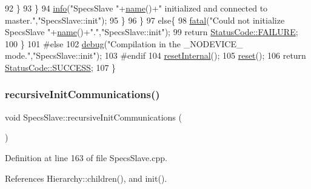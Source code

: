 \begin{DoxyCode}
92         \}
93       \}
94       \hyperlink{classObject_a644fd329ea4cb85f54fa6846484b84a8}{info}(\textcolor{stringliteral}{"SpecsSlave "}+\hyperlink{classObject_a300f4c05dd468c7bb8b3c968868443c1}{name}()+\textcolor{stringliteral}{" initialized and connected to master."},\textcolor{stringliteral}{"SpecsSlave::init"});
95     \}
96   \}
97   \textcolor{keywordflow}{else}\{
98     \hyperlink{classObject_aad5a16aac7516ce65bd5ec02ab07fc80}{fatal}(\textcolor{stringliteral}{"Could not initialize SpecsSlave "}+\hyperlink{classObject_a300f4c05dd468c7bb8b3c968868443c1}{name}()+\textcolor{stringliteral}{"."},\textcolor{stringliteral}{"SpecsSlave::init"});
99     \textcolor{keywordflow}{return} \hyperlink{classStatusCode_a6f565cbeadc76d14c72f047e5e85eb4ba3da73d4c469762eb9d3c960368252b26}{StatusCode::FAILURE}; 
100   \}
101 \textcolor{preprocessor}{#else
}
102   \hyperlink{classObject_aac010553f022165573714b7014a15f0d}{debug}(\textcolor{stringliteral}{"Compilation in the \_NODEVICE\_ mode."},\textcolor{stringliteral}{"SpecsSlave::init"});
103 \textcolor{preprocessor}{#endif
}
104   \hyperlink{classSpecsSlave_aa4f2493eabe522bb6651abcd67a6a690}{resetInternal}();
105   \hyperlink{classSpecsSlave_a6c69baff5941cabed2947f547041bbeb}{reset}();
106   \textcolor{keywordflow}{return} \hyperlink{classStatusCode_a6f565cbeadc76d14c72f047e5e85eb4badd0da38d3ba0d922efd1f4619bc37ad8}{StatusCode::SUCCESS};
107 \}
\end{DoxyCode}
\mbox{\label{classSpecsSlave_a347b94c2ba660ccde6927fe72590a1bc}} 
\subsubsection{\texorpdfstring{recursive\+Init\+Communications()}{recursiveInitCommunications()}}
{\footnotesize\ttfamily void Specs\+Slave\+::recursive\+Init\+Communications (\begin{DoxyParamCaption}{ }\end{DoxyParamCaption})}



Definition at line 163 of file Specs\+Slave.\+cpp.



References Hierarchy\+::children(), and init().


